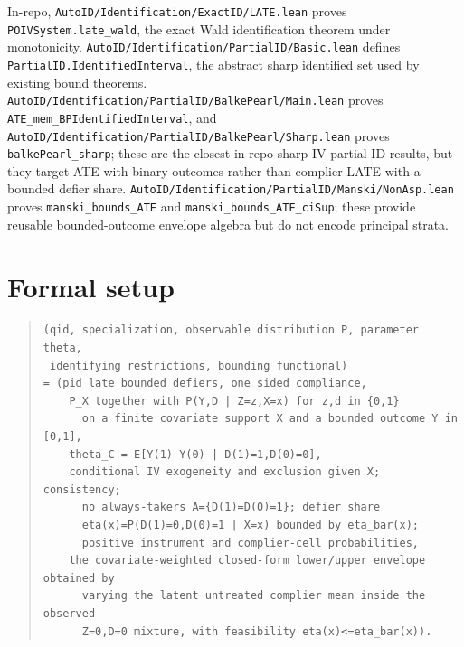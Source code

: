 \documentclass[11pt]{article}
\theoremstyle{definition}
\theoremstyle{plain}
\theoremstyle{remark}
\begin{document}
In-repo, \texttt{AutoID/Identification/ExactID/LATE.lean} proves \texttt{POIVSystem.late\_wald}, the exact Wald identification theorem under monotonicity.  \texttt{AutoID/Identification/PartialID/Basic.lean} defines \texttt{PartialID.IdentifiedInterval}, the abstract sharp identified set used by existing bound theorems.  \texttt{AutoID/Identification/PartialID/BalkePearl/Main.lean} proves \texttt{ATE\_mem\_BPIdentifiedInterval}, and \texttt{AutoID/Identification/PartialID/BalkePearl/Sharp.lean} proves \texttt{balkePearl\_sharp}; these are the closest in-repo sharp IV partial-ID results, but they target ATE with binary outcomes rather than complier LATE with a bounded defier share.  \texttt{AutoID/Identification/PartialID/Manski/NonAsp.lean} proves \texttt{manski\_bounds\_ATE} and \texttt{manski\_bounds\_ATE\_ciSup}; these provide reusable bounded-outcome envelope algebra but do not encode principal strata.

\section{Formal setup}
\begin{quote}\small
\begin{verbatim}
(qid, specialization, observable distribution P, parameter theta,
 identifying restrictions, bounding functional)
= (pid_late_bounded_defiers, one_sided_compliance,
    P_X together with P(Y,D | Z=z,X=x) for z,d in {0,1}
      on a finite covariate support X and a bounded outcome Y in [0,1],
    theta_C = E[Y(1)-Y(0) | D(1)=1,D(0)=0],
    conditional IV exogeneity and exclusion given X; consistency;
      no always-takers A={D(1)=D(0)=1}; defier share
      eta(x)=P(D(1)=0,D(0)=1 | X=x) bounded by eta_bar(x);
      positive instrument and complier-cell probabilities,
    the covariate-weighted closed-form lower/upper envelope obtained by
      varying the latent untreated complier mean inside the observed
      Z=0,D=0 mixture, with feasibility eta(x)<=eta_bar(x)).
\end{verbatim}
\end{quote}
\end{document}
